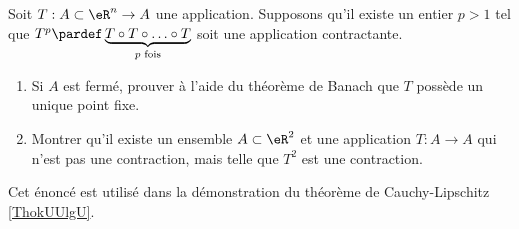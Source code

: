 
\begin{exercice}\label{exoTP20090002}

    Soit $T : A \subset {\eR}^n \to A$ une application. Supposons qu'il existe un entier $p > 1$ tel que $T^p \pardef \underbrace{T \circ T \circ \ldots \circ T}_{p \text{ fois}}$ soit une application contractante.

\begin{enumerate}
\item
Si $A$ est fermé, prouver à l'aide du théorème de Banach que $T$ possède un unique point fixe.
\item
Montrer qu'il existe un ensemble $A\subset \eR^2$ et une application $T : A \to A$ qui n'est pas une contraction, mais telle que $T^2$ est une contraction.
\end{enumerate}

\begin{remark}
    Cet énoncé est utilisé dans la démonstration du théorème de Cauchy-Lipschitz \ref{ThokUUlgU}.
\end{remark}

\end{exercice}

